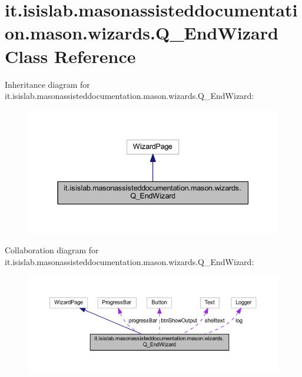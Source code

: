 \hypertarget{classit_1_1isislab_1_1masonassisteddocumentation_1_1mason_1_1wizards_1_1_q___end_wizard}{\section{it.\-isislab.\-masonassisteddocumentation.\-mason.\-wizards.\-Q\-\_\-\-End\-Wizard Class Reference}
\label{classit_1_1isislab_1_1masonassisteddocumentation_1_1mason_1_1wizards_1_1_q___end_wizard}
}


Inheritance diagram for it.\-isislab.\-masonassisteddocumentation.\-mason.\-wizards.\-Q\-\_\-\-End\-Wizard\-:
\nopagebreak
\begin{figure}[H]
\begin{center}
\leavevmode
\includegraphics[width=337pt]{classit_1_1isislab_1_1masonassisteddocumentation_1_1mason_1_1wizards_1_1_q___end_wizard__inherit__graph}
\end{center}
\end{figure}


Collaboration diagram for it.\-isislab.\-masonassisteddocumentation.\-mason.\-wizards.\-Q\-\_\-\-End\-Wizard\-:
\nopagebreak
\begin{figure}[H]
\begin{center}
\leavevmode
\includegraphics[width=350pt]{classit_1_1isislab_1_1masonassisteddocumentation_1_1mason_1_1wizards_1_1_q___end_wizard__coll__graph}
\end{center}
\end{figure}
